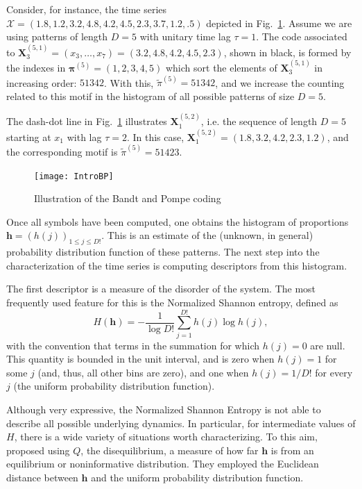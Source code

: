 Consider, for instance, the time series $\mathcal X = (1.8, 1.2, 3.2, 4.8, 4.2, 4.5, 2.3, 3.7, 1.2, .5)$ depicted in Fig.~\ref{Fig:IntroBP}.
Assume we are using patterns of length $D=5$ with unitary time lag $\tau=1$.
The code associated to $\mathbf X_{3}^{(5,1)}=(x_3,\dots,x_7)=(3.2, 4.8, 4.2, 4.5, 2.3)$, shown in black, is formed by the indexes in $\bm\pi^{(5)}=(1,2,3,4,5)$ which sort the elements of $\mathbf X_{3}^{(5,1)}$ in increasing order: $51342$.
With this, $\widetilde{\pi}^{(5)} = 51342$, and we increase the counting related to this motif in the histogram of all possible patterns of size $D=5$.

The dash-dot line in Fig.~\ref{Fig:IntroBP} illustrates $\mathbf X_{1}^{(5,2)}$, i.e. the sequence of length $D=5$ starting at $x_1$ with lag $\tau=2$.
In this case, $\mathbf X_{1}^{(5,2)}= (1.8, 3.2, 4.2, 2.3, 1.2)$, and the corresponding motif is $\widetilde{\pi}^{(5)}=51423$.

\begin{figure}[H]
\centering
\texttt{[image: IntroBP]}
\caption{Illustration of the Bandt and Pompe coding}
\label{Fig:IntroBP}
\end{figure}

Once all symbols have been computed, one obtains the histogram of proportions $\bm h = (h(j))_{1\leq j\leq D!}$.
This is an estimate of the (unknown, in general) probability distribution function of these patterns.
The next step into the characterization of the time series is computing descriptors from this histogram.

The first descriptor is a measure of the disorder of the system.
The most frequently used feature for this is the Normalized Shannon entropy, defined as
\begin{equation}
H(\bm h) = -\frac{1}{\log D!} \sum_{j=1}^{D!} h(j) \log h(j),
\end{equation}
with the convention that terms in the summation for which $h(j)=0$ are null.
This quantity is bounded in the unit interval, and is zero when $h(j)=1$ for some $j$ (and, thus, all other bins are zero), and one when $h(j)=1/D!$ for every $j$ (the uniform probability distribution function).

Although very expressive, the Normalized Shannon Entropy is not able to describe all possible underlying dynamics.
In particular, for intermediate values of $H$, there is a wide variety of situations worth characterizing.
To this aim, \citeauthor{LopezRuiz1995}~\citeyear{LopezRuiz1995} proposed using $Q$, the disequilibrium, a measure of how far $\bm h$ is from an equilibrium or noninformative distribution.
They employed the Euclidean distance between $\bm h$ and the uniform probability distribution function.

